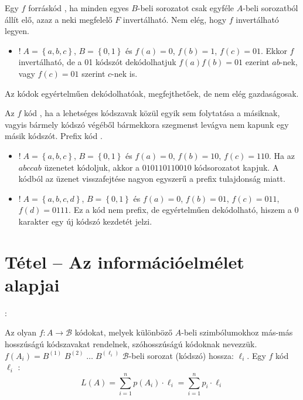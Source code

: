 \documentclass[main.tex]{subfiles}
\begin{document}
  Egy $f$ forráskód ,
  ha minden egyes $B$-beli sorozatot csak egyféle
  $A$-beli sorozatból állít elő, azaz a neki
  megfelelő $F$ invertálható. Nem elég, hogy $f$
  invertálható legyen.
  \begin{itemize}
    \item $! \; A = \left\{a, b, c\right\}$, $B = \left\{ 0, 1\right\}$
    és $f(a) = 0$, $f(b) = 1$, $f(c) = 01$. Ekkor $f$ invertálható,
    de a 01 kódszót dekódolhatjuk $f(a) f(b) = 01$ ezerint $ab$-nek,
    vagy $f(c)=01$ szerint $c$-nek is.
  \end{itemize}
  Az 
  kódok egyértelműen dekódolhatóak, megfejthetőek,
  de nem elég gazdaságosak.

  Az $f$ kód , ha a lehetséges kódszavak közül
  egyik sem folytatása a másiknak, vagyis bármely kódszó
  végéből bármekkora szegmenst levágva nem kapunk egy másik
  kódszót. Prefix kód .
  \begin{itemize}
    \item $! \; A = \left\{a, b, c\right\}$, $B = \left\{ 0, 1\right\}$
    és $f(a) = 0$, $f(b) = 10$, $f(c) = 110$. Ha az $abccab$ üzenetet
    kódoljuk, akkor a $010110110010$ kódsorozatot kapjuk. A kódból
    az üzenet visszafejtése nagyon egyszerű a prefix tulajdonság miatt.

    \item  $! \; A = \left\{a, b, c, d\right\}$, $B = \left\{ 0, 1\right\}$
    és $f(a) = 0$, $f(b) = 01$, $f(c) = 011$, $f(d)=0111$.
    Ez a kód nem prefix, de egyértelműen dekódolható, hiszem a $0$
    karakter egy új kódszó kezdetét jelzi.
  \end{itemize}


  \section{Tétel – Az információelmélet alapjai} %

  {\large {}:}
  \vspace{.5em}

  Az olyan $f: A \rightarrow \mathcal{B}$ kódokat,
  melyek különböző $A$-beli szimbólumokhoz más-más
  hosszúságú kódszavakat rendelnek, 
  szóhosszúságú kódoknak nevezzük.
  $f(A_i) = B^{(1)} \; B^{(2)} \; \dots \; B^{(\ell_i)}$
  $\mathcal{B}$-beli sorozat (kódszó) hossza: ${\ell_i}$.
  Egy $f$ kód  $\ell_i$
  :
  \begin{equation*}
    L(A) = \sum_{i=1}^n p(A_i) \cdot \ell_i =
    \sum_{i=1}^n p_i \cdot\ell_i
  \end{equation*}
\end{document}
